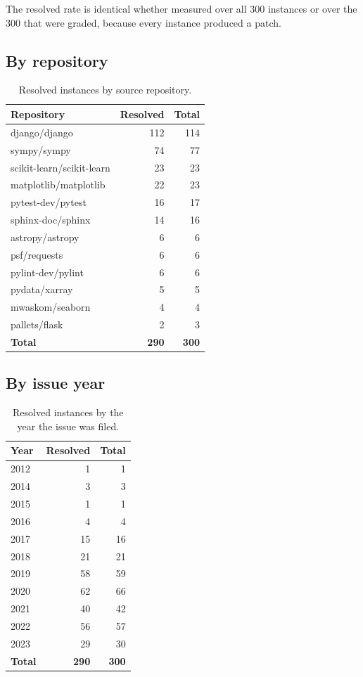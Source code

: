 \documentclass[11pt,a4paper]{article}
\begin{document}
The resolved rate is identical whether measured over all 300 instances or over the 300
that were graded, because every instance produced a patch.

\subsection{By repository}

\begin{table}[H]
\centering
\caption{Resolved instances by source repository.}
\label{tab:byrepo}
\begin{tabular}{@{}lrr@{}}
\toprule
Repository & Resolved & Total \\
\midrule
django/django & 112 & 114 \\
sympy/sympy & 74 & 77 \\
scikit-learn/scikit-learn & 23 & 23 \\
matplotlib/matplotlib & 22 & 23 \\
pytest-dev/pytest & 16 & 17 \\
sphinx-doc/sphinx & 14 & 16 \\
astropy/astropy & 6 & 6 \\
psf/requests & 6 & 6 \\
pylint-dev/pylint & 6 & 6 \\
pydata/xarray & 5 & 5 \\
mwaskom/seaborn & 4 & 4 \\
pallets/flask & 2 & 3 \\
\midrule
\textbf{Total} & \textbf{290} & \textbf{300} \\
\bottomrule
\end{tabular}
\end{table}

\subsection{By issue year}

\begin{table}[H]
\centering
\caption{Resolved instances by the year the issue was filed.}
\label{tab:byyear}
\begin{tabular}{@{}lrr@{}}
\toprule
Year & Resolved & Total \\
\midrule
2012 & 1 & 1 \\
2014 & 3 & 3 \\
2015 & 1 & 1 \\
2016 & 4 & 4 \\
2017 & 15 & 16 \\
2018 & 21 & 21 \\
2019 & 58 & 59 \\
2020 & 62 & 66 \\
2021 & 40 & 42 \\
2022 & 56 & 57 \\
2023 & 29 & 30 \\
\midrule
\textbf{Total} & \textbf{290} & \textbf{300} \\
\bottomrule
\end{tabular}
\end{table}
\end{document}
